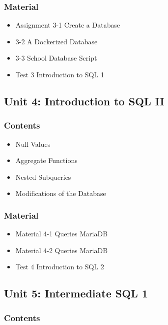 \documentclass[catalan, a4paper, 12pt, titlepage]{article}
\begin{document}
  \subsubsection{Material}

  \begin{itemize}
	  \item Assignment 3-1 Create a Database
	  \item 3-2 A Dockerized Database
	  \item 3-3 School Database Script
	  \item Test 3 Introduction to SQL 1
  \end{itemize}

  \subsection{Unit 4: Introduction to SQL II}

  \subsubsection{Contents}
  \begin{itemize}
	  \item Null Values
	  \item Aggregate Functions
	  \item Nested Subqueries
	  \item Modifications of the Database
  \end{itemize}
  
  \subsubsection{Material}

  \begin{itemize}
	  \item Material 4-1 Queries MariaDB
	  \item Material 4-2 Queries MariaDB
	  \item Test 4 Introduction to SQL 2
  \end{itemize}

  \subsection{Unit 5: Intermediate SQL 1}

  \subsubsection{Contents}
\end{document}
